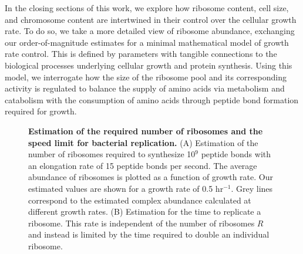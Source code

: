In the closing sections of this work, we explore how ribosome content, cell
size, and chromosome content are intertwined in their control over the cellular
growth rate. To do so, we take a more detailed view of ribosome abundance,
exchanging our order-of-magnitude estimates for a minimal mathematical model of
growth rate control. This is defined by parameters with tangible connections to
the biological processes underlying cellular growth and protein synthesis. Using
this model, we interrogate how the size of the ribosome pool and its
corresponding activity is regulated to balance the supply of amino acids via
metabolism and catabolism with the consumption of amino acids through peptide
bond formation required for growth.

\begin{figure}
        \caption{\textbf{Estimation of the required number of ribosomes and the
        speed limit for bacterial replication.} (A) Estimation of the
        number of ribosomes required to synthesize 10$^9$ peptide bonds with an
        elongation rate of 15 peptide bonds per second. The
        average abundance of ribosomes is plotted as a function of growth rate.
        Our estimated values are shown for a growth rate of 0.5 hr$^{-1}$.
        Grey lines correspond to the estimated complex abundance calculated at
        different growth rates. (B) Estimation for the time to replicate a
        ribosome. This rate is independent of the number of ribosomes $R$ and instead is limited by the time required to
        double an individual ribosome.} \label{fig:protein_synthesis}


\end{figure}
